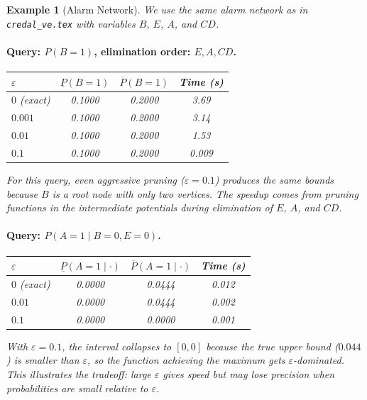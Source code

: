 \documentclass[11pt]{article}
\newtheorem{example}{Example}
\begin{document}
\begin{example}[Alarm Network]
We use the same alarm network as in \texttt{credal\_ve.tex} with variables $B$, $E$,
$A$, and $CD$.

\paragraph{Query: $P(B{=}1)$, elimination order: $E, A, CD$.}

\begin{center}
\begin{tabular}{lccc}
\toprule
$\varepsilon$ & $\underline{P}(B{=}1)$ & $\overline{P}(B{=}1)$ & Time (s) \\
\midrule
$0$ (exact) & 0.1000 & 0.2000 & 3.69 \\
$0.001$ & 0.1000 & 0.2000 & 3.14 \\
$0.01$ & 0.1000 & 0.2000 & 1.53 \\
$0.1$ & 0.1000 & 0.2000 & 0.009 \\
\bottomrule
\end{tabular}
\end{center}

For this query, even aggressive pruning ($\varepsilon = 0.1$) produces the same bounds
because $B$ is a root node with only two vertices. The speedup comes from pruning
functions in the intermediate potentials during elimination of $E$, $A$, and $CD$.

\paragraph{Query: $P(A{=}1 \mid B{=}0, E{=}0)$.}

\begin{center}
\begin{tabular}{lccc}
\toprule
$\varepsilon$ & $\underline{P}(A{=}1 \mid \cdot)$ & $\overline{P}(A{=}1 \mid \cdot)$ & Time (s) \\
\midrule
$0$ (exact) & 0.0000 & 0.0444 & 0.012 \\
$0.01$ & 0.0000 & 0.0444 & 0.002 \\
$0.1$ & 0.0000 & 0.0000 & 0.001 \\
\bottomrule
\end{tabular}
\end{center}

With $\varepsilon = 0.1$, the interval collapses to $[0, 0]$ because the true upper
bound ($0.044$) is smaller than $\varepsilon$, so the function achieving the maximum
gets $\varepsilon$-dominated. This illustrates the tradeoff: large $\varepsilon$
gives speed but may lose precision when probabilities are small relative to $\varepsilon$.
\end{example}
\end{document}
